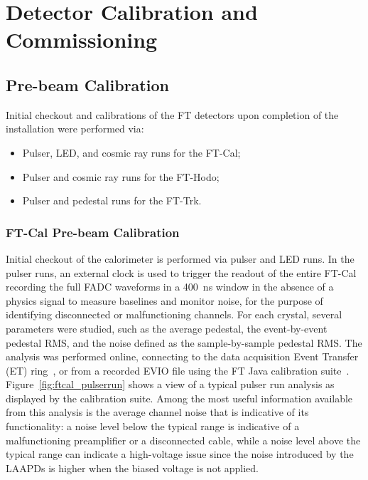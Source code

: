 \section{Detector Calibration and Commissioning}
\label{sec:calibration}

\subsection{Pre-beam Calibration}

Initial checkout and calibrations of the FT detectors upon completion of the installation were performed via:
\begin{itemize}
    \item Pulser, LED, and cosmic ray runs for the FT-Cal;
    \item Pulser and cosmic ray runs for the FT-Hodo;
    \item Pulser and pedestal runs for the FT-Trk.
\end{itemize}

\subsubsection{FT-Cal Pre-beam Calibration}

Initial checkout of the calorimeter is performed via pulser and LED runs. In the pulser runs, an external clock is
used to trigger the readout of the entire FT-Cal recording the full FADC waveforms in a 400~ns window in the
absence of a physics signal to measure baselines and monitor noise, for the purpose of identifying disconnected
or malfunctioning channels. For each crystal, several parameters were studied, such as the average pedestal, the
event-by-event pedestal RMS, and the noise defined as the sample-by-sample pedestal RMS. The analysis was
performed online, connecting to the data acquisition Event Transfer (ET) ring~\cite{daq}, or from a recorded
EVIO file using the FT Java calibration suite~\cite{reconstruction}. Figure~\ref{fig:ftcal_pulserrun} shows a
view of a typical pulser run analysis as displayed by the calibration suite. Among the most useful information
available from this analysis is the average channel noise that is indicative of its functionality: a noise level below
the typical range is indicative of a malfunctioning preamplifier or a disconnected cable, while a noise level above the
typical range can indicate a high-voltage issue since the noise introduced by the LAAPDs is higher when the biased
voltage is not applied. 

